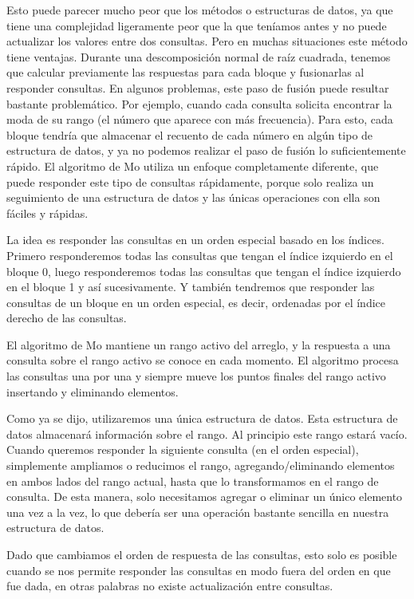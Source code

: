 Esto puede parecer mucho peor que los métodos o estructuras de datos, ya que tiene una complejidad ligeramente peor que la que teníamos antes y no puede actualizar los valores entre dos consultas. Pero en muchas situaciones este método tiene ventajas. Durante una descomposición normal de raíz cuadrada, tenemos que calcular previamente las respuestas para cada bloque y fusionarlas al responder consultas. En algunos problemas, este paso de fusión puede resultar bastante problemático. Por ejemplo, cuando cada consulta solicita encontrar la moda de su rango (el número que aparece con más frecuencia). Para esto, cada bloque tendría que almacenar el recuento de cada número en algún tipo de estructura de datos, y ya no
podemos realizar el paso de fusión lo suficientemente rápido. El algoritmo de Mo utiliza un enfoque completamente diferente, que puede responder este tipo de consultas rápidamente, porque solo realiza un seguimiento de una estructura de datos y las únicas operaciones con ella son fáciles y rápidas.

La idea es responder las consultas en un orden especial basado en los índices. Primero responderemos todas las consultas que tengan el índice izquierdo en el bloque 0, luego responderemos todas las consultas que tengan el índice izquierdo en el bloque 1 y así sucesivamente. Y también tendremos que responder las consultas de un bloque en un orden especial, es decir, ordenadas por el índice derecho de las consultas.

El algoritmo de Mo mantiene un rango activo del arreglo, y la respuesta a una consulta sobre el rango activo se conoce en cada momento. El algoritmo procesa las consultas una por una y siempre mueve los puntos finales del rango activo insertando y eliminando elementos. 

Como ya se dijo, utilizaremos una única estructura de datos. Esta estructura de datos almacenará información sobre el rango. Al principio este rango estará vacío. Cuando queremos responder la siguiente consulta (en el orden especial), simplemente ampliamos o reducimos el rango, agregando/eliminando elementos en ambos lados del rango actual, hasta que lo transformamos en el rango de consulta. De esta manera, solo necesitamos agregar o eliminar un único elemento una vez a la vez, lo que debería ser una operación bastante sencilla en nuestra estructura de datos.

Dado que cambiamos el orden de respuesta de las consultas, esto solo es posible cuando se nos permite responder las consultas en modo fuera del orden en que fue dada, en otras palabras no existe actualización entre consultas.

